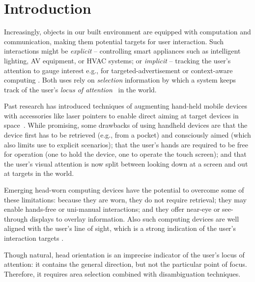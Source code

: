 \section{Introduction}

Increasingly, objects in our built environment are equipped with computation and communication, making them potential targets for user interaction. Such interactions might be {\em explicit} -- controlling smart appliances such as intelligent lighting, AV equipment, or HVAC systems; or {\em implicit} -- tracking the user's attention to gauge interest e.g., for targeted-advertisement or context-aware computing . Both uses rely on {\em selection} information by which a system keeps track of the user's {\em locus of attention}~\cite{raskin} in the world.

Past research has introduced techniques of augmenting hand-held mobile devices with accessories like laser pointers to enable direct aiming at target devices in space~\cite{beigl_point_1999,patel_2-way_2003}. While promising, some drawbacks of using handheld devices are that the device first has to be retrieved (e.g., from a pocket) and consciously aimed (which also limits use to explicit scenarios); that the user's hands are required to be free for operation (one to hold the device, one to operate the touch screen); and that the user's visual attention is now split between looking down at a screen and out at targets in the world. 

Emerging head-worn computing devices have the potential to overcome some of these limitations: because they are worn, they do not require retrieval; they may enable hands-free or uni-manual interactions; and they offer near-eye or see-through displays to overlay information. Also such computing devices are well aligned with the user's line of sight, which is a strong indication of the user's interaction targets .

Though natural, head orientation is an imprecise indicator of the user's locus of attention: it contains the general direction, but not the particular point of focus. 
Therefore, it requires area selection  combined with disambiguation techniques.

